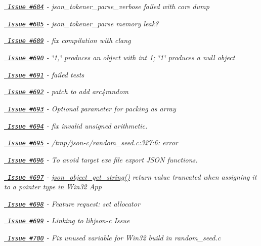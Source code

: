 \begin{DoxyItemize}
\item {\itshape \href{https://github.com/json-c/json-c/issues/684}{\texttt{ Issue \#684}} -\/ json\+\_\+tokener\+\_\+parse\+\_\+verbose failed with core dump}
\item {\itshape \href{https://github.com/json-c/json-c/issues/685}{\texttt{ Issue \#685}} -\/ json\+\_\+tokener\+\_\+parse memory leak?}
\item {\itshape \href{https://github.com/json-c/json-c/issues/689}{\texttt{ Issue \#689}} -\/ fix compilation with clang}
\item {\itshape \href{https://github.com/json-c/json-c/issues/690}{\texttt{ Issue \#690}} -\/ \char`\"{}1,\char`\"{} produces an object with int 1; \char`\"{}1\char`\"{} produces a null object}
\item {\itshape \href{https://github.com/json-c/json-c/issues/691}{\texttt{ Issue \#691}} -\/ failed tests}
\item {\itshape \href{https://github.com/json-c/json-c/issues/692}{\texttt{ Issue \#692}} -\/ patch to add arc4random}
\item {\itshape \href{https://github.com/json-c/json-c/issues/693}{\texttt{ Issue \#693}} -\/ Optional parameter for packing as array}
\item {\itshape \href{https://github.com/json-c/json-c/issues/694}{\texttt{ Issue \#694}} -\/ fix invalid unsigned arithmetic.}
\item {\itshape \href{https://github.com/json-c/json-c/issues/695}{\texttt{ Issue \#695}} -\/ /tmp/json-\/c/random\+\_\+seed.c\+:327\+:6\+: error}
\item {\itshape \href{https://github.com/json-c/json-c/issues/696}{\texttt{ Issue \#696}} -\/ To avoid target exe file export JSON functions.}
\item {\itshape \href{https://github.com/json-c/json-c/issues/697}{\texttt{ Issue \#697}} -\/ \mbox{\hyperlink{json__object_8h_a9ee29ca8d79896e15007131527f6002e}{json\+\_\+object\+\_\+get\+\_\+string()}} return value truncated when assigning it to a pointer type in Win32 App}
\item {\itshape \href{https://github.com/json-c/json-c/issues/698}{\texttt{ Issue \#698}} -\/ Feature request\+: set allocator}
\item {\itshape \href{https://github.com/json-c/json-c/issues/699}{\texttt{ Issue \#699}} -\/ Linking to libjson-\/c Issue}
\item {\itshape \href{https://github.com/json-c/json-c/issues/700}{\texttt{ Issue \#700}} -\/ Fix unused variable for Win32 build in random\+\_\+seed.\+c}

\end{DoxyItemize}
